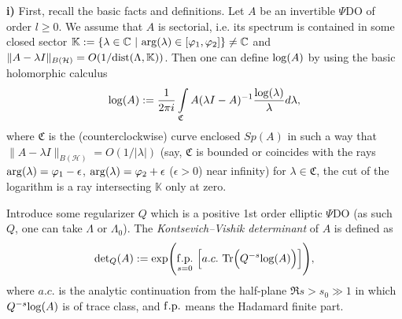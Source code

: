 \documentclass{amsart}
\begin{document}
{\bf i)} First, recall the basic facts and definitions. Let $A$ be an invertible $\Psi$DO of order $l\ge 0$. We assume that $A$ is sectorial, i.e. its spectrum is contained in some closed sector $\mathbb{K}:=\{\lambda\in\mathbb{C} \ | \ {\rm arg}(\lambda)\in[\varphi_1,\varphi_2]\}\ne\mathbb{C}$ and $\|A-\lambda I\|_{B(\mathcal{H})}=O(1/{\rm dist}(\Lambda,\mathbb{K}))$. Then one can define ${\rm log}(A)$ by using the basic holomorphic calculus
$${\rm log}(A):=\frac{1}{2\pi i}\int\limits_{\mathfrak{C}}A(\lambda I-A)^{-1}\frac{{\rm log}(\lambda)}{\lambda}d\lambda,$$
where $\mathfrak{C}$ is the (counterclockwise) curve enclosed $Sp(A)$ in such a way that $\|A-\lambda I\|_{B(\mathcal{H})}=O(1/|\lambda|)$ (say, $\mathfrak{C}$ is bounded or coincides with the rays ${\rm arg}(\lambda)=\varphi_1-\epsilon$, ${\rm arg}(\lambda)=\varphi_2+\epsilon$ ($\epsilon>0$) near infinity) for $\lambda\in\mathfrak{C}$, the cut of the logarithm is a ray intersecting $\mathbb{K}$ only at zero. 

Introduce some regularizer $Q$ which is a positive 1st order elliptic $\Psi$DO (as such $Q$, one can take $\Lambda$ or $\Lambda_0$). The {\it Kontsevich–Vishik determinant} of $A$ is defined as
\begin{equation*}
{\rm det}_Q(A):={\rm exp}\Bigg(\underset{s=0}{\rm f.p.}\,\,\Big[a.c.\,\,{\rm Tr}\Big(Q^{-s}{\rm log}(A)\Big)\Big]\Bigg),
\end{equation*}
where $a.c.$ is the analytic continuation from the half-plane $\Re s>s_0\gg 1$ in which $Q^{-s}{\rm log}(A)$ is of trace class, and ${\rm f.p.}$ means the Hadamard finite part. 
\end{document}
